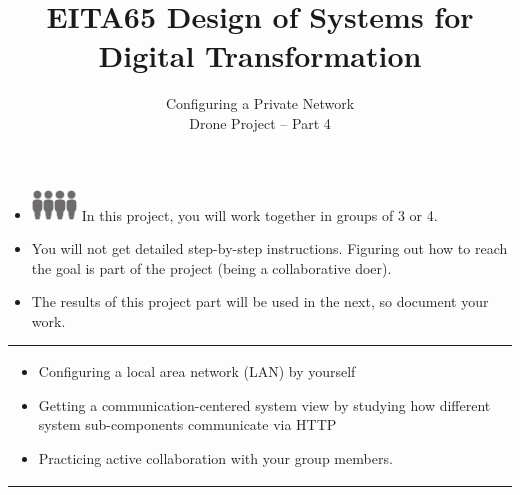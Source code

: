 \documentclass{article}
\title{EITA65 Design of Systems for Digital Transformation\\\year}
\author{\huge Configuring a Private Network\\Drone Project -- Part 4}
\begin{document}
\clearpage\maketitle
\thispagestyle{empty}%

\begin{itemize}
\item \includegraphics[width=3mm]{person.png}\includegraphics[width=3mm]{person.png}\includegraphics[width=3mm]{person.png}\includegraphics[width=3mm]{person.png} In this project, you will work together in groups  of 3 or 4.  
\item You will not get detailed step-by-step instructions. Figuring out how to reach the goal is part of the project (being a collaborative doer).
\item The results of this project part will be used in the next, so document your work.
\end{itemize}

\vspace{.1cm}
\begin{center}
\begin{tabular}{l}
\toprule[1.5pt]
\parbox{0.8\linewidth}{
\vspace{.2cm}{\Large Learning goals:}
\begin{itemize}
    \item Configuring a local area network (LAN) by yourself
    \item Getting a communication-centered system view by studying how different system sub-components communicate via HTTP
    \item Practicing active collaboration with your group members.
\end{itemize}}\\
\bottomrule[1.5pt]
\end{tabular}
\end{center}
\vfill
\vspace{2cm}
\end{document}
